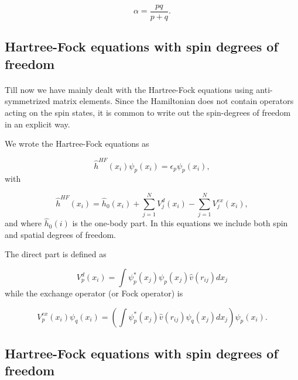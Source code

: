 \documentclass[%
twoside,                 %
final,                   %
10pt]{article}
\begin{document}
\begin{equation}
  \alpha = \frac{pq}{p + q}.
\end{equation}



\subsection*{Hartree-Fock equations with spin degrees of freedom}

\paragraph{}

Till now we have mainly dealt with the Hartree-Fock equations using anti-symmetrized matrix elements. Since the Hamiltonian does not 
contain operators acting on the spin states, it is common to write out the spin-degrees of freedom in an explicit way.

We wrote the Hartree-Fock equations as

\begin{equation*}
  \hat{h}^{HF}(x_i) \psi_{p}(x_i) = \epsilon_{p}\psi_{p}(x_i),
\end{equation*}
with

\begin{equation*}
  \hat{h}^{HF}(x_i)= \hat{h}_0(x_i) + \sum_{j=1}^NV_{j}^{d}(x_i) -
  \sum_{j=1}^NV_{j}^{ex}(x_i),
\end{equation*}
and where $\hat{h}_0(i)$ is the one-body part.
In this equations we include both spin and spatial degrees of freedom.

The direct part is defined as

\begin{equation*}
  V_{p}^{d}(x_i) = \int \psi_{p}^*(x_j)\psi_{p}(x_j)\hat{v}(r_{ij}) dx_j
\end{equation*}
while the exchange operator (or Fock operator) is

\begin{equation*}
  V_{p}^{ex}(x_i) \psi_{q}(x_i) 
  = \left(\int \psi_{p}^*(x_j) 
  \hat{v}(r_{ij})\psi_{q}(x_j)
  dx_j\right)\psi_{p}(x_i).
\end{equation*}



\subsection*{Hartree-Fock equations with spin degrees of freedom}
\end{document}
